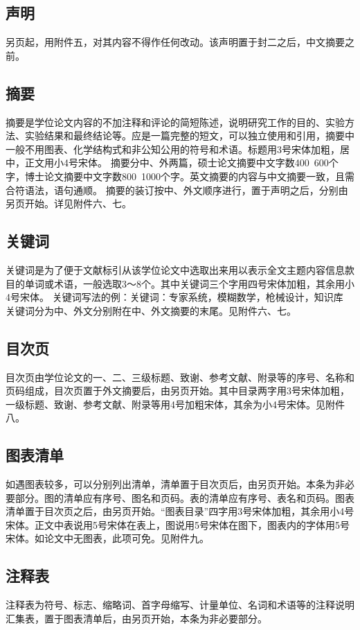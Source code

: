 \subsection{声明}
另页起，用附件五，对其内容不得作任何改动。该声明置于封二之后，中文摘要之前。

\subsection{摘要}
摘要是学位论文内容的不加注释和评论的简短陈述，说明研究工作的目的、实验方法、实验结果和最终结论等。应是一篇完整的短文，可以独立使用和引用，摘要中一般不用图表、化学结构式和非公知公用的符号和术语。标题用3号宋体加粗，居中，正文用小4号宋体。
摘要分中、外两篇，硕士论文摘要中文字数400~600个字，博士论文摘要中文字数800~1000个字。英文摘要的内容与中文摘要一致，且需合符语法，语句通顺。
摘要的装订按中、外文顺序进行，置于声明之后，分别由另页开始。详见附件六、七。

\subsection{关键词}
关键词是为了便于文献标引从该学位论文中选取出来用以表示全文主题内容信息款目的单词或术语，一般选取3～8个。其中关键词三个字用四号宋体加粗，其余用小4号宋体。
关键词写法的例：关键词：专家系统，模糊数学，枪械设计，知识库
关键词分为中、外文分别附在中、外文摘要的末尾。见附件六、七。

\subsection{目次页}
目次页由学位论文的一、二、三级标题、致谢、参考文献、附录等的序号、名称和页码组成，目次页置于外文摘要后，由另页开始。其中目录两字用3号宋体加粗，一级标题、致谢、参考文献、附录等用4号加粗宋体，其余为小4号宋体。见附件八。

\subsection{图表清单}
如遇图表较多，可以分别列出清单，清单置于目次页后，由另页开始。本条为非必要部分。图的清单应有序号、图名和页码。表的清单应有序号、表名和页码。图表清单置于目次页之后，由另页开始。“图表目录”四字用3号宋体加粗，其余用小4号宋体。正文中表说用5号宋体在表上，图说用5号宋体在图下，图表内的字体用5号宋体。如论文中无图表，此项可免。见附件九。

\subsection{注释表}
注释表为符号、标志、缩略词、首字母缩写、计量单位、名词和术语等的注释说明汇集表，置于图表清单后，由另页开始，本条为非必要部分。

